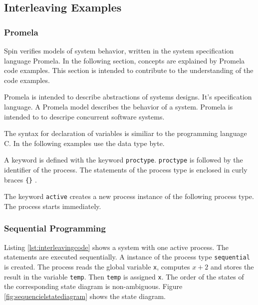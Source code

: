 \documentclass[a4paper, twoside]{article}
\begin{document}
\subsection{Interleaving Examples}
\label{sec:interleavingexamples}

\subsubsection{Promela}
\label{sec:promela}

Spin verifies models of system behavior, written in the system specification language Promela. In the following section, concepts are explained by Promela code examples. This section is intended to contribute to the understanding of the code examples.

Promela is intended to describe abstractions of systems designs. It's specification language. A Promela model describes the behavior of a system. Promela is intended to to descripe concurrent software systems.

The syntax for declaration of variables is similiar to the programming language C. In the following examples use the data type byte.

A keyword is defined with the keyword \verb|proctype|. \verb|proctype| is followed by the identifier of the process. The statements of the process type is enclosed in curly braces \verb|{}| \cite{holzmann03}.

The keyword \verb|active| creates a new process instance of the following process type. The process starts immediately.

\subsubsection{Sequential Programming}
\label{sec:sequential}

Listing \ref{lst:interleavingcode} shows a system with one active process. The statements are executed sequentially. A instance of the process type \verb|sequential| is created. The process reads the global variable \verb|x|, computes $x+2$ and stores the result in the variable \verb|temp|. Then \verb|temp| is assigned \verb|x|. The order of the states of the corresponding state diagram is non-ambiguous. Figure \ref{fig:sequencielstatediagram} shows the state diagram.

   
\end{document}
